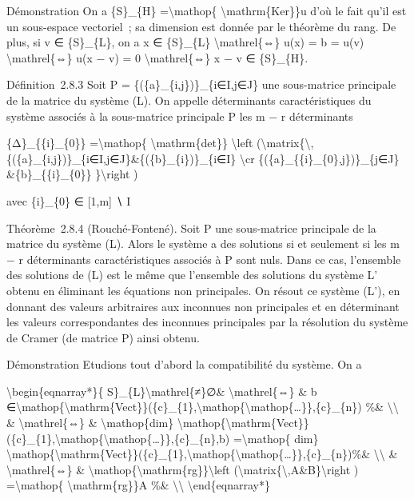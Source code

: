 \documentclass[]{article}
\begin{document}
Démonstration On a \{S\}\_\{H\} =\textbackslash{}mathop\{
\textbackslash{}mathrm\{Ker\}\}u d'où le fait qu'il est un sous-espace
vectoriel~; sa dimension est donnée par le théorème du rang. De plus, si
v ∈ \{S\}\_\{L\}, on a x ∈ \{S\}\_\{L\} \textbackslash{}mathrel\{⇔\}
u(x) = b = u(v) \textbackslash{}mathrel\{⇔\} u(x − v) = 0
\textbackslash{}mathrel\{⇔\} x − v ∈ \{S\}\_\{H\}.

Définition~2.8.3 Soit P = \{(\{a\}\_\{i,j\})\}\_\{i∈I,j∈J\} une
sous-matrice principale de la matrice du système (L). On appelle
déterminants caractéristiques du système associés à la sous-matrice
principale P les m − r déterminants

\{Δ\}\_\{\{i\}\_\{0\}\} =\textbackslash{}mathop\{
\textbackslash{}mathrm\{det\}\} \textbackslash{}left
(\textbackslash{}matrix\{\textbackslash{},\{(\{a\}\_\{i,j\})\}\_\{i∈I,j∈J\}\&\{(\{b\}\_\{i\})\}\_\{i∈I\}
\textbackslash{}cr \{(\{a\}\_\{\{i\}\_\{0\},j\})\}\_\{j∈J\}
\&\{b\}\_\{\{i\}\_\{0\}\} \}\textbackslash{}right )

avec \{i\}\_\{0\} ∈ {[}1,m{]} ∖ I

Théorème~2.8.4 (Rouché-Fontené). Soit P une sous-matrice principale de
la matrice du système (L). Alors le système a des solutions si et
seulement si les m − r déterminants caractéristiques associés à P sont
nuls. Dans ce cas, l'ensemble des solutions de (L) est le même que
l'ensemble des solutions du système L' obtenu en éliminant les équations
non principales. On résout ce système (L'), en donnant des valeurs
arbitraires aux inconnues non principales et en déterminant les valeurs
correspondantes des inconnues principales par la résolution du système
de Cramer (de matrice P) ainsi obtenu.

Démonstration Etudions tout d'abord la compatibilité du système. On a

\textbackslash{}begin\{eqnarray*\}\{
S\}\_\{L\}\textbackslash{}mathrel\{≠\}∅\& \textbackslash{}mathrel\{⇔\}
\& b
∈\textbackslash{}mathop\{\textbackslash{}mathrm\{Vect\}\}(\{c\}\_\{1\},\textbackslash{}mathop\{\textbackslash{}mathop\{\ldots{}\}\},\{c\}\_\{n\})
\%\& \textbackslash{}\textbackslash{} \& \textbackslash{}mathrel\{⇔\} \&
\textbackslash{}mathop\{dim\}
\textbackslash{}mathop\{\textbackslash{}mathrm\{Vect\}\}(\{c\}\_\{1\},\textbackslash{}mathop\{\textbackslash{}mathop\{\ldots{}\}\},\{c\}\_\{n\},b)
=\textbackslash{}mathop\{ dim\}
\textbackslash{}mathop\{\textbackslash{}mathrm\{Vect\}\}(\{c\}\_\{1\},\textbackslash{}mathop\{\textbackslash{}mathop\{\ldots{}\}\},\{c\}\_\{n\})\%\&
\textbackslash{}\textbackslash{} \& \textbackslash{}mathrel\{⇔\} \&
\textbackslash{}mathop\{\textbackslash{}mathrm\{rg\}\}\textbackslash{}left
(\textbackslash{}matrix\{\textbackslash{},A\&B\}\textbackslash{}right )
=\textbackslash{}mathop\{ \textbackslash{}mathrm\{rg\}\}A \%\&
\textbackslash{}\textbackslash{} \textbackslash{}end\{eqnarray*\}
\end{document}
